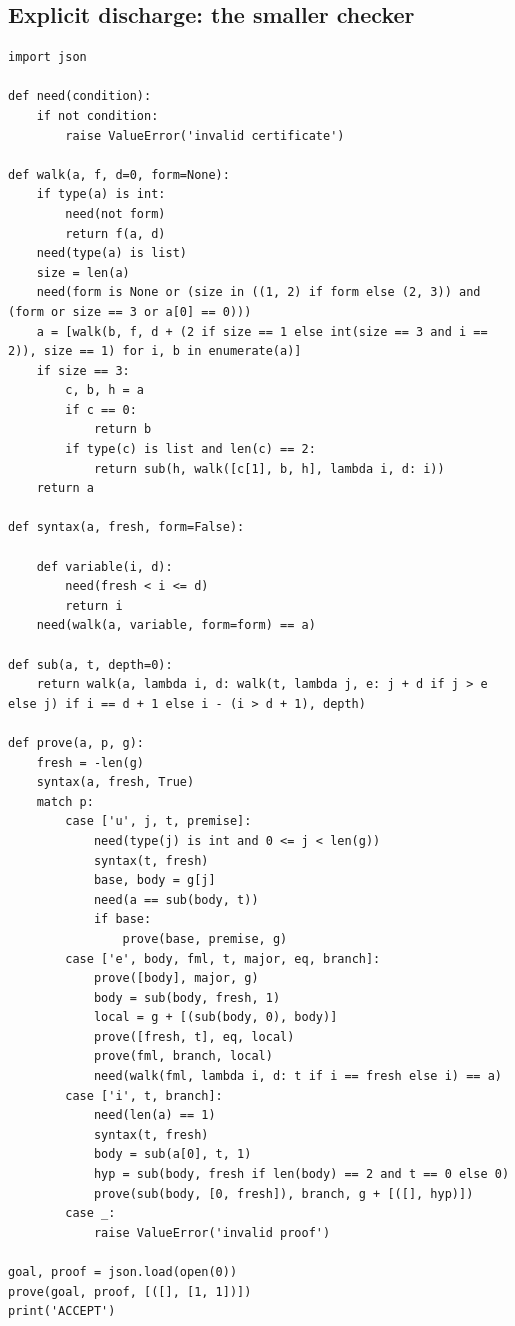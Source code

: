 \documentclass[11pt,letterpaper]{article}
\theoremstyle{definition}\newtheorem{definition}[theorem]{Definition}
\theoremstyle{remark}\newtheorem{remark}[theorem]{Remark}
\begin{document}
\subsection{Explicit discharge: the smaller checker}
\begin{lstlisting}
import json

def need(condition):
    if not condition:
        raise ValueError('invalid certificate')

def walk(a, f, d=0, form=None):
    if type(a) is int:
        need(not form)
        return f(a, d)
    need(type(a) is list)
    size = len(a)
    need(form is None or (size in ((1, 2) if form else (2, 3)) and (form or size == 3 or a[0] == 0)))
    a = [walk(b, f, d + (2 if size == 1 else int(size == 3 and i == 2)), size == 1) for i, b in enumerate(a)]
    if size == 3:
        c, b, h = a
        if c == 0:
            return b
        if type(c) is list and len(c) == 2:
            return sub(h, walk([c[1], b, h], lambda i, d: i))
    return a

def syntax(a, fresh, form=False):

    def variable(i, d):
        need(fresh < i <= d)
        return i
    need(walk(a, variable, form=form) == a)

def sub(a, t, depth=0):
    return walk(a, lambda i, d: walk(t, lambda j, e: j + d if j > e else j) if i == d + 1 else i - (i > d + 1), depth)

def prove(a, p, g):
    fresh = -len(g)
    syntax(a, fresh, True)
    match p:
        case ['u', j, t, premise]:
            need(type(j) is int and 0 <= j < len(g))
            syntax(t, fresh)
            base, body = g[j]
            need(a == sub(body, t))
            if base:
                prove(base, premise, g)
        case ['e', body, fml, t, major, eq, branch]:
            prove([body], major, g)
            body = sub(body, fresh, 1)
            local = g + [(sub(body, 0), body)]
            prove([fresh, t], eq, local)
            prove(fml, branch, local)
            need(walk(fml, lambda i, d: t if i == fresh else i) == a)
        case ['i', t, branch]:
            need(len(a) == 1)
            syntax(t, fresh)
            body = sub(a[0], t, 1)
            hyp = sub(body, fresh if len(body) == 2 and t == 0 else 0)
            prove(sub(body, [0, fresh]), branch, g + [([], hyp)])
        case _:
            raise ValueError('invalid proof')

goal, proof = json.load(open(0))
prove(goal, proof, [([], [1, 1])])
print('ACCEPT')
\end{lstlisting}
\end{document}

